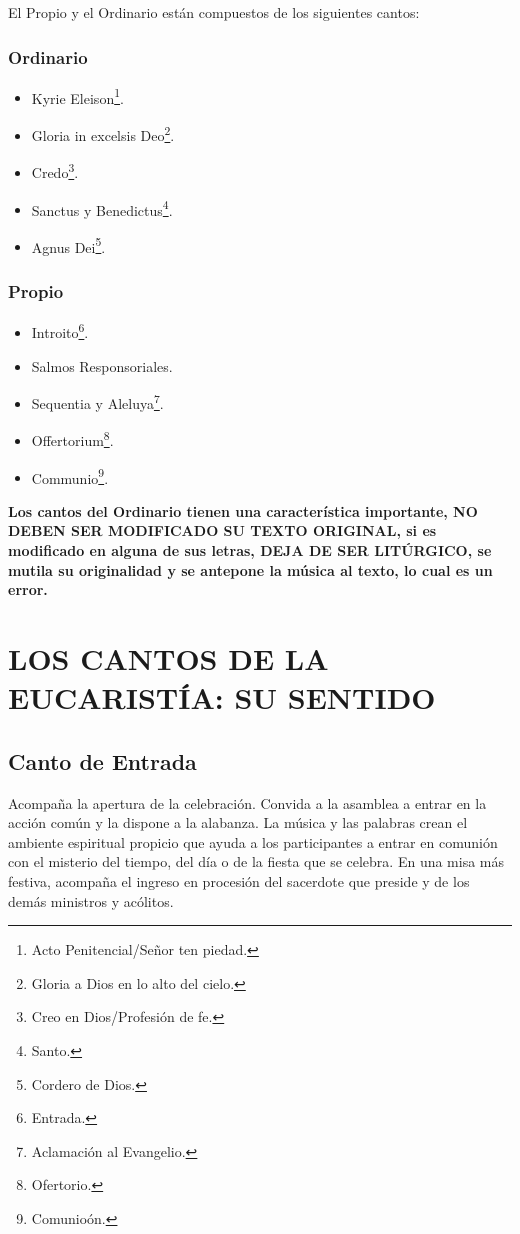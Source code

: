 \documentclass[letterpaper, 12pt]{book}
\begin{document}
    El Propio y el Ordinario est\'an compuestos de los siguientes cantos:

    \subsection{Ordinario}
    
    \begin{itemize}
        \item Kyrie Eleison\footnote{Acto Penitencial/Se\~nor ten piedad.}.
        \item Gloria in excelsis Deo\footnote{Gloria a Dios en lo alto del cielo.}.
        \item Credo\footnote{Creo en Dios/Profesi\'on de fe.}.
        \item Sanctus y Benedictus\footnote{Santo.}.
        \item Agnus Dei\footnote{Cordero de Dios.}.
    \end{itemize}
    
    \subsection{Propio}
    
    \begin{itemize}
        \item Introito\footnote{Entrada.}.
        \item Salmos Responsoriales.
        \item Sequentia y Aleluya\footnote{Aclamaci\'on al Evangelio.}.
        \item Offertorium\footnote{Ofertorio.}.
        \item Communio\footnote{Comunio\'on.}.
    \end{itemize}
    
    \textbf{Los cantos del Ordinario tienen una caracter\'istica importante, NO DEBEN SER MODIFICADO SU TEXTO ORIGINAL, si es modificado en alguna de sus letras, DEJA DE SER LIT\'URGICO, se mutila su originalidad y se antepone la m\'usica al texto, lo cual es un error.}
    
    \chapter{LOS CANTOS DE LA EUCARIST\'IA: SU SENTIDO}
    
    \section{Canto de Entrada}
    Acompa\~na la apertura de la celebraci\'on. Convida a la asamblea a entrar en la acci\'on com\'un y la dispone a la alabanza. La m\'usica y las palabras crean el ambiente espiritual propicio que ayuda a los participantes a entrar en comuni\'on con el misterio del tiempo, del d\'ia o de la fiesta que se celebra. En una misa m\'as festiva, acompa\~na el ingreso en procesi\'on del sacerdote que preside y de los demás ministros y ac\'olitos.\newline
    
\end{document}
